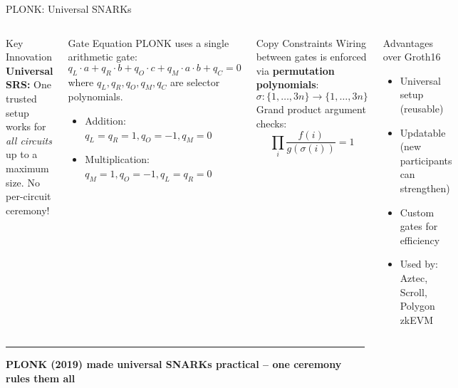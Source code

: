 \documentclass[8pt,aspectratio=169]{beamer}
\newcommand{\bottomnote}[1]{\vfill\vspace{-2mm}\textcolor{mllavender2}{\rule{\textwidth}{0.4pt}}\vspace{1mm}\footnotesize\textbf{#1}}
\begin{document}
\begin{frame}{PLONK: Universal SNARKs}
\begin{columns}[T]
\begin{block}{Key Innovation}
\footnotesize
\textbf{Universal SRS:} One trusted setup works for \textit{all circuits} up to a maximum size. No per-circuit ceremony!
\end{block}
\vspace{1mm}
\begin{block}{Gate Equation}
\footnotesize
PLONK uses a single arithmetic gate:
\[
q_L \cdot a + q_R \cdot b + q_O \cdot c + q_M \cdot a \cdot b + q_C = 0
\]
where $q_L, q_R, q_O, q_M, q_C$ are selector polynomials.
\begin{itemize}
  \item Addition: $q_L = q_R = 1, q_O = -1, q_M = 0$
  \item Multiplication: $q_M = 1, q_O = -1, q_L = q_R = 0$
\end{itemize}
\end{block}

\begin{block}{Copy Constraints}
\footnotesize
Wiring between gates is enforced via \textbf{permutation polynomials}:
\[
\sigma: \{1, \ldots, 3n\} \rightarrow \{1, \ldots, 3n\}
\]
Grand product argument checks:
\[
\prod_{i} \frac{f(i)}{g(\sigma(i))} = 1
\]
\end{block}
\vspace{2mm}
\begin{exampleblock}{\footnotesize Advantages over Groth16}
\footnotesize
\begin{itemize}
  \item Universal setup (reusable)
  \item Updatable (new participants can strengthen)
  \item Custom gates for efficiency
  \item Used by: Aztec, Scroll, Polygon zkEVM
\end{itemize}
\end{exampleblock}
\end{columns}
\bottomnote{PLONK (2019) made universal SNARKs practical -- one ceremony rules them all}
\end{frame}
\end{document}
